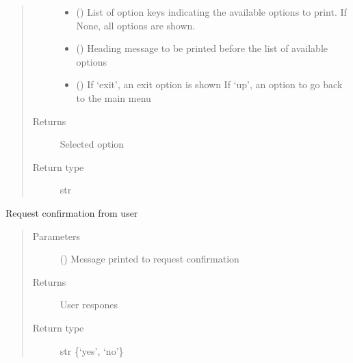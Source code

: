 \documentclass[letterpaper,10pt,english]{sphinxmanual}
\begin{document}
\begin{fulllineitems}
\begin{fulllineitems}
\begin{quote}
\begin{description}
\begin{itemize}
\item {} 
\sphinxAtStartPar
{} () \textendash{} List of option keys indicating the available options to print.
If None, all options are shown.

\item {} 
\sphinxAtStartPar
{} () \textendash{} Heading message to be printed before the list of available options

\item {} 
\sphinxAtStartPar
{} () \textendash{} If ‘exit’, an exit option is shown
If ‘up’, an option to go back to the main menu

\end{itemize}

\item[{Returns}] \leavevmode
\sphinxAtStartPar
{} \textendash{} Selected option

\item[{Return type}] \leavevmode
\sphinxAtStartPar
str

\end{description}\end{quote}

\end{fulllineitems}


\begin{fulllineitems}
\label{\detokenize{mn_menu_navigator:src.menu_navigator.menu_navigator.MenuNavigator.request_confirmation}}
\sphinxAtStartPar
Request confirmation from user
\begin{quote}\begin{description}
\item[{Parameters}] \leavevmode
\sphinxAtStartPar
{} () \textendash{} Message printed to request confirmation

\item[{Returns}] \leavevmode
\sphinxAtStartPar
{} \textendash{} User respones

\item[{Return type}] \leavevmode
\sphinxAtStartPar
str \{‘yes’, ‘no’\}

\end{description}\end{quote}

\end{fulllineitems}


\end{fulllineitems}
\end{document}

